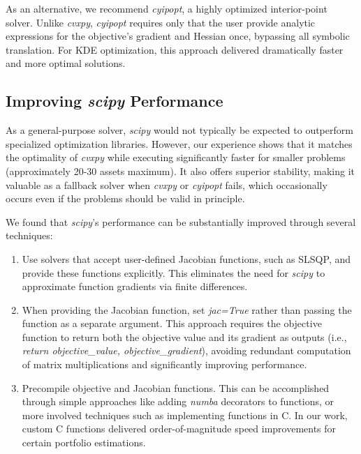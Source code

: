 As an alternative, we recommend \textit{cyipopt}, a highly optimized interior-point solver. Unlike \textit{cvxpy}, \textit{cyipopt} requires only that the user provide analytic expressions for the objective's gradient and Hessian once, bypassing all symbolic translation. For KDE optimization, this approach delivered dramatically faster and more optimal solutions.

\subsection{Improving \textit{scipy} Performance}
As a general-purpose solver, \textit{scipy} would not typically be expected to outperform specialized optimization libraries. However, our experience shows that it matches the optimality of \textit{cvxpy} while executing significantly faster for smaller problems (approximately 20-30 assets maximum). It also offers superior stability, making it valuable as a fallback solver when \textit{cvxpy} or \textit{cyipopt} fails, which occasionally occurs even if the problems should be valid in principle.

We found that \textit{scipy}'s performance can be substantially improved through several techniques:

\begin{enumerate}
\item Use solvers that accept user-defined Jacobian functions, such as SLSQP, and provide these functions explicitly. This eliminates the need for \textit{scipy} to approximate function gradients via finite differences.

\item When providing the Jacobian function, set \textit{jac=True} rather than passing the function as a separate argument. This approach requires the objective function to return both the objective value and its gradient as outputs (i.e., \textit{return objective\_value, objective\_gradient}), avoiding redundant computation of matrix multiplications and significantly improving performance.

\item Precompile objective and Jacobian functions. This can be accomplished through simple approaches like adding \textit{numba} decorators to functions, or more involved techniques such as implementing functions in C. In our work, custom C functions delivered order-of-magnitude speed improvements for certain portfolio estimations.
\end{enumerate}


